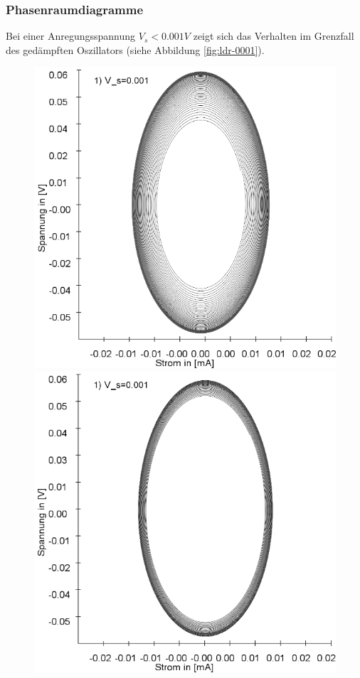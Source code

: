 \documentclass{scrartcl}
\begin{document}
\subsubsection{Phasenraumdiagramme}
Bei einer Anregungsspannung $V_s < 0.001V$ zeigt sich das Verhalten im Grenzfall des gedämpften Oszillators (siehe Abbildung \ref{fig:ldr-0001}).
\begin{figure}
\includegraphics[scale=0.28]{schwing-runge-nach50k-weitere200k-10-9}
\includegraphics[scale=0.28]{schwing-runge-nach100k-weitere200k-10-9}

\end{figure}
\end{document}
